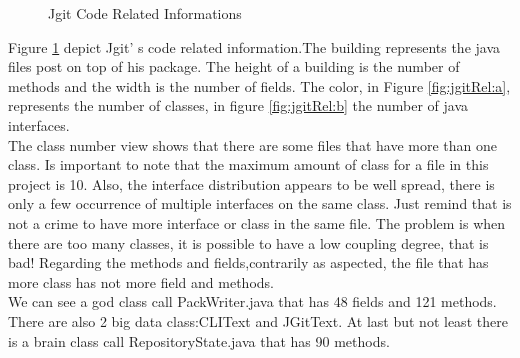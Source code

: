 \documentclass[]{usiinfbachelorproject}
\begin{document}
            \begin{figure}[h]
            \hspace*{\fill}
            
            \caption{Jgit Code Related Informations \label{fig:jgitRel}
            }
            \end{figure}


Figure \ref{fig:jgitRel} depict Jgit' s code related information.The building represents the java files post on top of his package. The height of a building is the number of methods and the width is the number of fields. The color,  in Figure \ref{fig:jgitRel:a}, represents the number of classes, in figure \ref{fig:jgitRel:b} the number of java interfaces.\\
The class number view shows that there are some files that have more than one class. Is important to note that the maximum amount of class  for a file in this project is 10.  Also, the interface distribution appears to be well spread, there is only a few occurrence of multiple interfaces on the same class. Just remind that is not a crime to have more interface or class in the same file. The problem is when there are too many classes, it is possible to have a low coupling degree, that is bad! Regarding the methods and fields,contrarily as aspected, the file that has more class has not more field and methods.\\
We can see a god class call PackWriter.java that has 48 fields and 121 methods. There are also 2 big data class:CLIText and JGitText. At last but not least there is a brain class call RepositoryState.java that has 90 methods.
 
\end{document}
